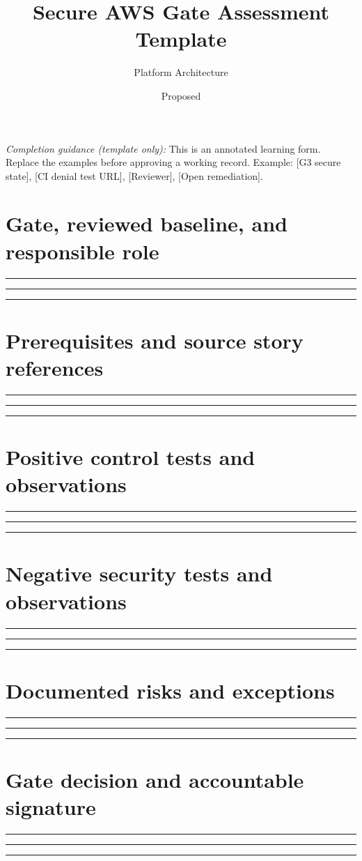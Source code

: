 \documentclass[11pt,letterpaper]{article}
\title{Secure AWS Gate Assessment Template}
\author{Platform Architecture}
\date{Proposed}
\newcommand{\WritingLines}{\par\vspace{5mm}\noindent\rule{\linewidth}{0.3pt}\par\vspace{5mm}\noindent\rule{\linewidth}{0.3pt}\par\vspace{5mm}\noindent\rule{\linewidth}{0.3pt}\par}
\begin{document}
\maketitle
\noindent\emph{Completion guidance (template only):} 
This is an annotated learning form. Replace the examples before approving a working record. Example: [G3 secure state], [CI denial test URL], [Reviewer], [Open remediation].
\section{Gate, reviewed baseline, and responsible role}
\WritingLines
\section{Prerequisites and source story references}
\WritingLines
\section{Positive control tests and observations}
\WritingLines
\section{Negative security tests and observations}
\WritingLines
\section{Documented risks and exceptions}
\WritingLines
\section{Gate decision and accountable signature}
\WritingLines
\end{document}
